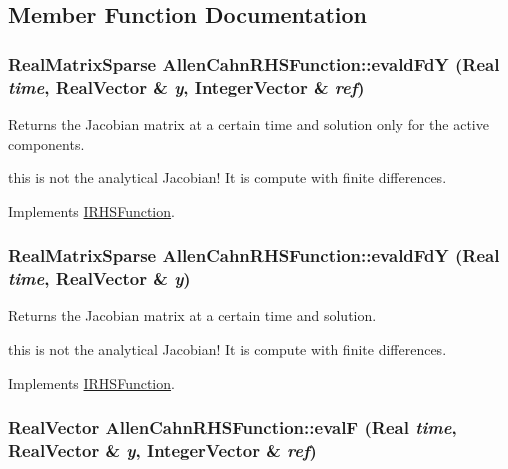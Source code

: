 \subsection{Member Function Documentation}
\hypertarget{classAllenCahnRHSFunction_a51d138b3083af6914800d956171dfa6a}{
\subsubsection[{evaldFdY}]{\setlength{\rightskip}{0pt plus 5cm}RealMatrixSparse AllenCahnRHSFunction::evaldFdY (Real {\em time}, \/  RealVector \& {\em y}, \/  IntegerVector \& {\em ref})}}
\label{classAllenCahnRHSFunction_a51d138b3083af6914800d956171dfa6a}


Returns the Jacobian matrix at a certain time and solution only for the active components. 

this is not the analytical Jacobian! It is compute with finite differences. 

Implements \hyperlink{classIRHSFunction}{IRHSFunction}.\hypertarget{classAllenCahnRHSFunction_ac203ad1a188d842e6a9a9e70762b2b30}{
\subsubsection[{evaldFdY}]{\setlength{\rightskip}{0pt plus 5cm}RealMatrixSparse AllenCahnRHSFunction::evaldFdY (Real {\em time}, \/  RealVector \& {\em y})}}
\label{classAllenCahnRHSFunction_ac203ad1a188d842e6a9a9e70762b2b30}


Returns the Jacobian matrix at a certain time and solution. 

this is not the analytical Jacobian! It is compute with finite differences. 

Implements \hyperlink{classIRHSFunction}{IRHSFunction}.\hypertarget{classAllenCahnRHSFunction_a4f2df77dfae069945cc40dc2b1eb0200}{
\subsubsection[{evalF}]{\setlength{\rightskip}{0pt plus 5cm}RealVector AllenCahnRHSFunction::evalF (Real {\em time}, \/  RealVector \& {\em y}, \/  IntegerVector \& {\em ref})}}
\label{classAllenCahnRHSFunction_a4f2df77dfae069945cc40dc2b1eb0200}


